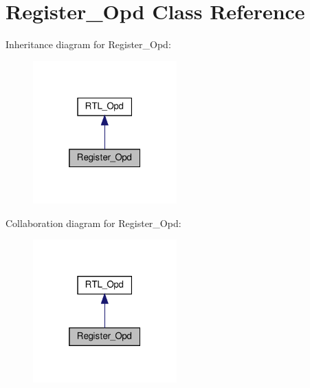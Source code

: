 \hypertarget{classRegister__Opd}{}\section{Register\+\_\+\+Opd Class Reference}
\label{classRegister__Opd}


Inheritance diagram for Register\+\_\+\+Opd\+:
\nopagebreak
\begin{figure}[H]
\begin{center}
\leavevmode
\includegraphics[width=157pt]{classRegister__Opd__inherit__graph}
\end{center}
\end{figure}


Collaboration diagram for Register\+\_\+\+Opd\+:
\nopagebreak
\begin{figure}[H]
\begin{center}
\leavevmode
\includegraphics[width=157pt]{classRegister__Opd__coll__graph}
\end{center}
\end{figure}
